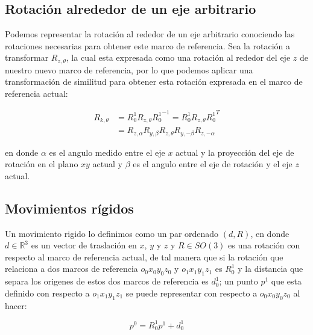 \begin{multicols*}{3}

        \subsection{Rotación alrededor de un eje arbitrario}

            Podemos representar la rotación al rededor de un eje arbitrario conociendo las rotaciones necesarias para obtener este marco de referencia. Sea la rotación a transformar $R_{z, \theta}$, la cual esta expresada como una rotación al rededor del eje $z$ de nuestro nuevo marco de referencia, por lo que podemos aplicar una transformación de similitud para obtener esta rotación expresada en el marco de referencia actual:

            \begin{align}
                R_{k, \theta} &= R_0^1 R_{z, \theta} {R_0^1}^{-1} = R_0^1 R_{z, \theta} {R_0^1}^{T} \nonumber \\
                &= R_{z, \alpha} R_{y, \beta} R_{z, \theta} R_{y, -\beta} R_{z, -\alpha}
            \end{align}

            en donde $\alpha$ es el angulo medido entre el eje $x$ actual y la proyección del eje de rotación en el plano $xy$ actual y $\beta$ es el angulo entre el eje de rotación y el eje $z$ actual.


        \subsection{Movimientos rígidos}

            Un movimiento rigido lo definimos como un par ordenado $(d, R)$, en donde $d \in \mathbb{R}^3$ es un vector de traslación en $x$, $y$ y $z$ y $R \in SO(3)$ es una rotación con respecto al marco de referencia actual, de tal manera que si la rotación que relaciona a dos marcos de referencia $o_0 x_0 y_0 z_0$ y $o_1 x_1 y_1 z_1$ es $R_0^1$ y la distancia que separa los origenes de estos dos marcos de referencia es $d_0^1$; un punto $p^1$ que esta definido con respecto a $o_1 x_1 y_1 z_1$ se puede representar con respecto a $o_0 x_0 y_0 z_0$ al hacer:

            \begin{equation}
                p^0 = R_0^1 p^1 + d_0^1
            \end{equation}


\end{multicols*}

